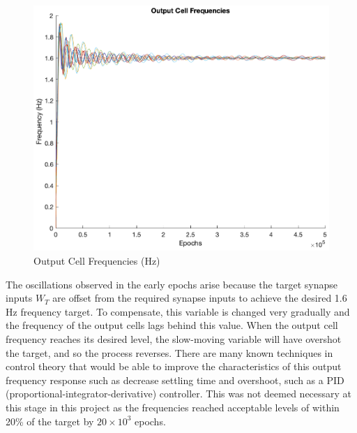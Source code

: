 \documentclass[11pt, twocolumn]{article}
\begin{document}
\begin{figure}[H]
	\centering
	\includegraphics[width=\linewidth]{output_cell_freqs}
	\caption{Output Cell Frequencies (Hz)}
	\label{fig:output_cell_freqs}
\end{figure}
The oscillations observed in the early epochs arise because the target synapse inputs $W_T$ are offset from the required synapse inputs to achieve the desired 1.6 Hz frequency target. To compensate, this variable is changed very gradually and the frequency of the output cells lags behind this value. When the output cell frequency reaches its desired level, the slow-moving variable will have overshot the target, and so the process reverses. There are many known techniques in control theory that would be able to improve the characteristics of this output frequency response such as decrease settling time and overshoot, such as a \acs{PID} (proportional-integrator-derivative) controller. This was not deemed necessary at this stage in this project as the frequencies reached acceptable levels of within 20\% of the target by $20\times10^3$ epochs.
\end{document}
